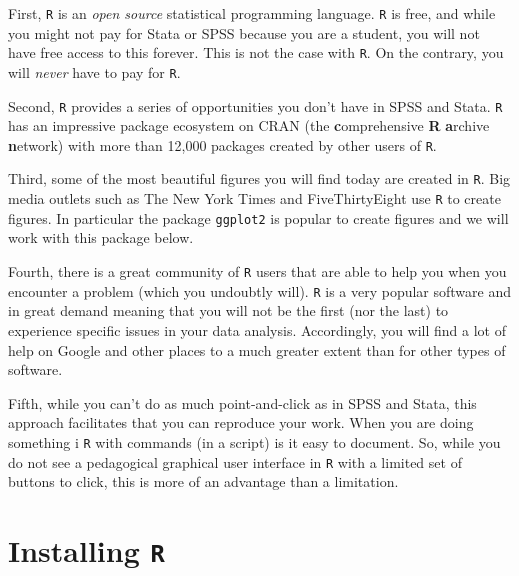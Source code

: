 \documentclass[12pt,oneside]{reedthesis}
\theoremstyle{definition}
\theoremstyle{definition}
\theoremstyle{definition}
\theoremstyle{remark}
\begin{document}
  First, \texttt{R} is an \emph{open source} statistical programming
  language. \texttt{R} is free, and while you might not pay for Stata or
  SPSS because you are a student, you will not have free access to this
  forever. This is not the case with \texttt{R}. On the contrary, you will
  \emph{never} have to pay for \texttt{R}.
  
  Second, \texttt{R} provides a series of opportunities you don't have in
  SPSS and Stata. \texttt{R} has an impressive package ecosystem on CRAN
  (the \textbf{c}omprehensive \textbf{R} \textbf{a}rchive
  \textbf{n}etwork) with more than 12,000 packages created by other users
  of \texttt{R}.
  
  Third, some of the most beautiful figures you will find today are
  created in \texttt{R}. Big media outlets such as The New York Times and
  FiveThirtyEight use \texttt{R} to create figures. In particular the
  package \texttt{ggplot2} is popular to create figures and we will work
  with this package below.
  
  Fourth, there is a great community of \texttt{R} users that are able to
  help you when you encounter a problem (which you undoubtly will).
  \texttt{R} is a very popular software and in great demand meaning that
  you will not be the first (nor the last) to experience specific issues
  in your data analysis. Accordingly, you will find a lot of help on
  Google and other places to a much greater extent than for other types of
  software.
  
  Fifth, while you can't do as much point-and-click as in SPSS and Stata,
  this approach facilitates that you can reproduce your work. When you are
  doing something i \texttt{R} with commands (in a script) is it easy to
  document. So, while you do not see a pedagogical graphical user
  interface in \texttt{R} with a limited set of buttons to click, this is
  more of an advantage than a limitation.
  
  \section{\texorpdfstring{Installing
  \texttt{R}}{Installing R}}\label{installing-r}
  
\end{document}
